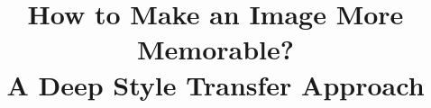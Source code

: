 \documentclass{sig-alternate-05-2015}
\begin{document}

\newcommand\Tstrut{\rule{0pt}{2.7ex}}         %
\newcommand\Bstrut{\rule[-0.9ex]{0pt}{0pt}}   %

\newcommand{\xavi}[1]{\textcolor{red}{\textbf{X:} #1}}
\newcommand{\glo}[1]{\textcolor{blue}{\textbf{G:} #1}}
\newcommand{\eli}[1]{\textcolor{magenta}{\textbf{E:} #1}}





%

\title{How to Make an Image More Memorable? \\A Deep Style Transfer Approach}

%
%
%
%
%
\end{document}
